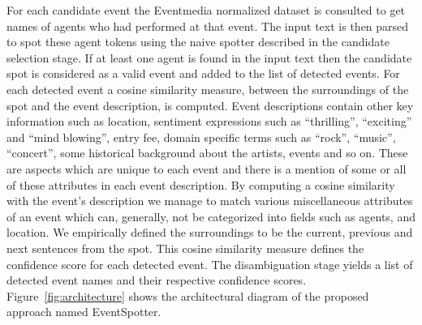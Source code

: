 \documentclass[10pt,a4paper]{article}
\begin{document}
For each candidate event the Eventmedia normalized dataset is consulted to get names of agents who had performed at that event. The input text is then parsed to spot these agent tokens using the naive spotter described in the candidate selection stage. If at least one agent is found in the input text then the candidate spot is considered as a valid event and added to the list of detected events. For each detected event a cosine similarity measure,  between the surroundings of the spot and the event description, is computed. Event descriptions contain other key information such as location, sentiment expressions such as ``thrilling'', ``exciting'' and ``mind blowing'', entry fee, domain specific terms such as ``rock'', ``music'', ``concert'', some historical background about the artists, events and so on. These are aspects which are unique to each event and there is a mention of some or all of these attributes in each event description. By computing a cosine similarity with the event's description we manage to match various miscellaneous attributes of an event which can, generally, not be categorized into fields such as agents, and location. We empirically defined the surroundings to be the current, previous and next sentences from the spot. This cosine similarity measure defines the confidence score for each detected event. The disambiguation stage yields a list of detected event names and their respective confidence scores.
Figure~\ref{fig:architecture} shows the architectural diagram of the proposed approach named EventSpotter. 
\end{document}
